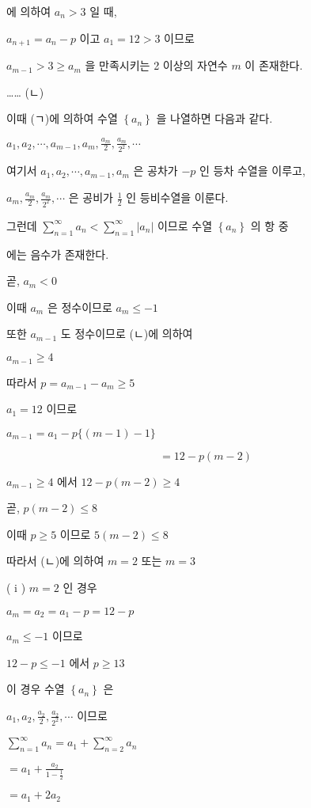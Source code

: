 \documentclass[10pt]{article}
\begin{document}
에 의하여 \(a_{n}>3\) 일 때,

\(a_{n+1}=a_{n}-p\) 이고 \(a_{1}=12>3\) 이므로

\(a_{m-1}>3 \geq a_{m}\) 을 만족시키는 2 이상의 자연수 \(m\) 이 존재한다.

…… (ㄴ)

이때 (ㄱ)에 의하여 수열 \(\left\{a_{n}\right\}\) 을 나열하면 다음과 같다.

\(a_{1}, a_{2}, \cdots, a_{m-1}, a_{m}, \frac{a_{m}}{2}, \frac{a_{m}}{2^{2}}, \cdots\)

여기서 \(a_{1}, a_{2}, \cdots, a_{m-1}, a_{m}\) 은 공차가 \(-p\) 인 등차 수열을 이루고,

\(a_{m}, \frac{a_{m}}{2}, \frac{a_{m}}{2^{2}}, \cdots\) 은 공비가 \(\frac{1}{2}\) 인 등비수열을 이룬다.

그런데 \(\sum_{n=1}^{\infty} a_{n}<\sum_{n=1}^{\infty}\left|a_{n}\right|\) 이므로 수열 \(\left\{a_{n}\right\}\) 의 항 중

에는 음수가 존재한다.

곧, \(a_{m}<0\)

이때 \(a_{m}\) 은 정수이므로 \(a_{m} \leq-1\)

또한 \(a_{m-1}\) 도 정수이므로 (ㄴ)에 의하여

\(a_{m-1} \geq 4\)

따라서 \(p=a_{m-1}-a_{m} \geq 5\)

\(a_{1}=12\) 이므로

\(a_{m-1}=a_{1}-p\{(m-1)-1\}\)

\[
=12-p(m-2)
\]

\(a_{m-1} \geq 4\) 에서 \(12-p(m-2) \geq 4\)

곧, \(p(m-2) \leq 8\)

이때 \(p \geq 5\) 이므로 \(5(m-2) \leq 8\)

따라서 (ㄴ)에 의하여 \(m=2\) 또는 \(m=3\)

( i ) \(m=2\) 인 경우

\(a_{m}=a_{2}=a_{1}-p=12-p\)

\(a_{m} \leq-1\) 이므로

\(12-p \leq-1\) 에서 \(p \geq 13\)

이 경우 수열 \(\left\{a_{n}\right\}\) 은

\(a_{1}, a_{2}, \frac{a_{2}}{2}, \frac{a_{2}}{2^{2}}, \cdots\) 이므로

\(\sum_{n=1}^{\infty} a_{n}=a_{1}+\sum_{n=2}^{\infty} a_{n}\)

\(=a_{1}+\frac{a_{2}}{1-\frac{1}{2}}\)

\(=a_{1}+2 a_{2}\)
\end{document}
